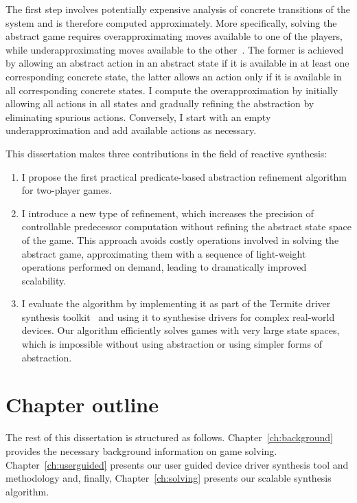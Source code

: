 The first step involves potentially expensive analysis of concrete transitions of the system and is therefore computed approximately.  More specifically, solving the abstract game requires overapproximating moves available to one of the players, while underapproximating moves available to the other~\cite{Henzinger_JM_03}.  The former is achieved by allowing an abstract action in an abstract state if it is available in at least one corresponding concrete state, the latter allows an action only if it is available in all corresponding concrete states.  I compute the overapproximation by initially allowing all actions in all states and gradually refining the abstraction by eliminating spurious actions.  Conversely, I start with an empty underapproximation and add available actions as necessary.

This dissertation makes three contributions in the field of reactive synthesis:
\begin{enumerate}
    \item I propose the first practical predicate-based abstraction refinement algorithm for two-player games.

    \item I introduce a new type of refinement, which increases the precision of controllable predecessor computation without refining the abstract state space of the game.  This approach avoids costly operations involved in solving the abstract game, approximating them with a sequence of light-weight operations performed on demand, leading to dramatically improved scalability.

    \item I evaluate the algorithm by implementing it as part of the Termite driver synthesis toolkit~\cite{Ryzhyk_WKLRSV_14} and using it to synthesise drivers for complex real-world devices.  Our algorithm efficiently solves games with very large state spaces, which is impossible without using abstraction or using simpler forms of abstraction.
\end{enumerate}

\section{Chapter outline}

The rest of this dissertation is structured as follows. Chapter~\ref{ch:background} provides the necessary background information on game solving. Chapter~\ref{ch:userguided} presents our user guided device driver synthesis tool and methodology and, finally, Chapter~\ref{ch:solving} presents our scalable synthesis algorithm.
